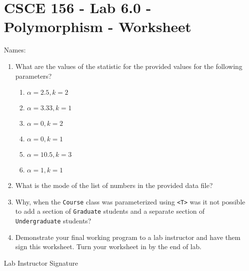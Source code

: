 \documentclass[12pt]{scrartcl}
\begin{document}
\section*{CSCE 156 - Lab 6.0 - Polymorphism - Worksheet}

Names: \underline{\hspace{10cm}}

\begin{enumerate}
  \item What are the values of the statistic for the provided values for the following parameters?
  \begin{enumerate}
    \item $\alpha = 2.5, k = 2$
    \item $\alpha = 3.33, k = 1$
    \item $\alpha = 0, k = 2$
    \item $\alpha = 0, k = 1$
    \item $\alpha = 10.5, k = 3$
    \item $\alpha = 1, k = 1$
  \end{enumerate}
  
  \item What is the mode of the list of numbers in the provided data file?

  \item Why, when the \texttt{Course} class was parameterized 
  using \texttt{<T>} was it not possible to add a section of 
  \texttt{Graduate} students and a separate section of 
  \texttt{Undergraduate} students?
  
  \item Demonstrate your final working program to a lab instructor 
  and have them sign this worksheet.  Turn your worksheet in by the 
  end of lab.

  
\end{enumerate}

Lab Instructor Signature\underline{\hspace{7.5cm}}
\end{document}
